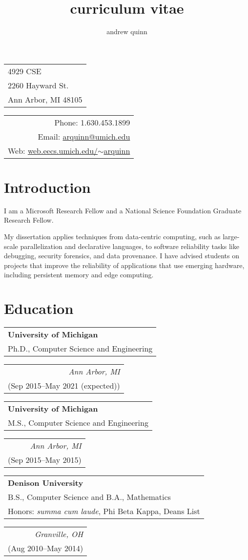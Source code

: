 \documentclass[letterpaper,10pt]{article}
\title{curriculum vitae}
\author{andrew quinn}
\makeatletter
\newcommand{\reitem}[2]{
  \begin{tabular}[t]{l}
    #2
  \end{tabular}
\hfill
\begin{tabular}[t]{r}
  #1
\end{tabular}
}
\newcommand{\quadItem}[4]{\reitem{\emph{#1}\\#2}{\textbf{#3}\\#4}}
\def \addr {4929 CSE\\2260 Hayward St.\\Ann Arbor, MI 48105}
\def \phone {1.630.453.1899}
\def \email {\href{mailto:arquinn@umich.edu}{arquinn@umich.edu}}
\def \website {\href{https://web.eecs.umich.edu/~arquinn}{web.eecs.umich.edu/$\sim$arquinn}}
\makeatother
\begin{document}
\setlength\parindent{0pt}
\setlength{\parskip}{3pt}

\maketitle
\begin{tabular}{l}
  \addr
\end{tabular}
\hfill
\begin{tabular}{r}
  Phone: \phone\\
  Email: \email\\
  Web: \website
\end{tabular}


\section{Introduction}

I am a Microsoft Research Fellow and a National Science Foundation Graduate
Research Fellow.

My dissertation applies techniques from data-centric computing, such as
large-scale parallelization and declarative languages, to software reliability
tasks like debugging, security forensics, and data provenance.  I have advised
students on projects that improve the reliability of applications that use
emerging hardware, including persistent memory and edge computing.

\section{Education}

\quadItem{Ann Arbor, MI}{(Sep 2015--May 2021 (expected))}{University of
  Michigan}{Ph.D., Computer Science and Engineering}

\quadItem{Ann Arbor, MI}{(Sep 2015--May 2015)}{University of Michigan}{M.S.,
  Computer Science and Engineering}

\quadItem{Granville, OH}{(Aug 2010--May 2014)}{Denison University}{B.S.,
  Computer Science and B.A., Mathematics\\ Honors: \textit{summa cum
    laude}, Phi Beta Kappa, Deans List}
\end{document}

